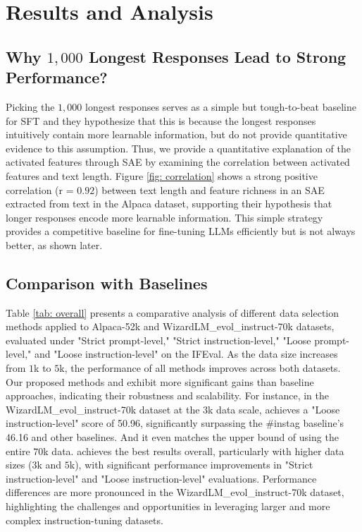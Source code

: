 \section{Results and Analysis}
\subsection{Why $1,000$ Longest Responses \citep{zhaolong} Lead to Strong Performance?}
Picking the $1,000$ longest responses \citep{zhaolong} serves as a simple but tough-to-beat baseline for SFT and they hypothesize that this is because the longest responses intuitively contain more learnable information, but do not provide quantitative evidence to this assumption. Thus, we provide a quantitative explanation of the activated features through SAE by examining the correlation between activated features and text length.
Figure \ref{fig: correlation} shows a strong positive correlation (r = $0.92$) between text length and feature richness in an SAE extracted from text in the Alpaca dataset, supporting their hypothesis that longer responses encode more learnable information. This simple strategy provides a competitive baseline for fine-tuning LLMs efficiently but is not always better, as shown later.



\subsection{Comparison with Baselines}

Table \ref{tab: overall} presents a comparative analysis of different data selection methods applied to Alpaca-52k and WizardLM\_evol\_instruct-70k datasets, evaluated under "Strict prompt-level," "Strict instruction-level," "Loose prompt-level," and "Loose instruction-level" on the IFEval.
As the data size increases from $1$k to $5$k, the performance of all methods improves across both datasets.
Our proposed methods \one and \two exhibit more significant gains than baseline approaches, indicating their robustness and scalability. For instance, in the WizardLM\_evol\_instruct-70k dataset at the 3k data scale, \two achieves a "Loose instruction-level" score of 50.96, significantly surpassing the \#instag baseline's 46.16 and other baselines. And it even matches the upper bound of using the entire $70$k data.
\two achieves the best results overall, particularly with higher data sizes ($3$k and $5$k), with significant performance improvements in "Strict instruction-level" and "Loose instruction-level" evaluations. Performance differences are more pronounced in the WizardLM\_evol\_instruct-70k dataset, highlighting the challenges and opportunities in leveraging larger and more complex instruction-tuning datasets.

